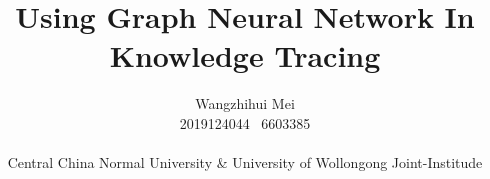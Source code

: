 \documentclass[a4paper,11pt]{article}
\begin{document}
\title{Using Graph Neural Network In Knowledge Tracing}
\author{Wangzhihui Mei \\ 2019124044 \ 6603385
\\ \\
Central China Normal University \& 
University of Wollongong Joint-Institude}


\date{}

\maketitle
\thispagestyle{empty}
\clearpage


\newpage
\setcounter{page}{1} %




\clearpage
%
%
\end{document}
